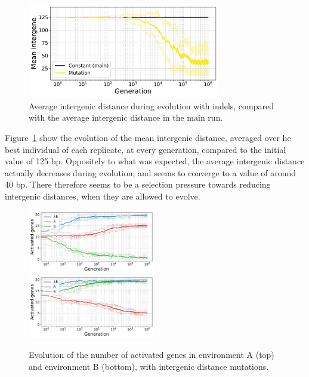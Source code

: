 \begin{figure}
\centering
  \includegraphics[width=0.75\textwidth]{param/evolve-intergene/intergenic_size_all.pdf}
\caption[Average intergenic size during evolution, with intergenic distance mutations]{Average intergenic distance during evolution with indels, compared with the average intergenic distance in the main run.}
\label{fig:param:evolve-intergene-intergene}
\end{figure}

Figure~\ref{fig:param:evolve-intergene-intergene} show the evolution of the mean intergenic distance, averaged over he best individual of each replicate, at every generation, compared to the initial value of 125 bp.
Oppositely to what was expected, the average intergenic distance actually decreases during evolution, and seems to converge to a value of around 40 bp.
There therefore seems to be a selection pressure towards reducing intergenic distances, when they are allowed to evolve.

\begin{figure}[H]
  \centering
  \includegraphics[width=0.495\textwidth]{param/evolve-intergene/gene_activity_env_A.pdf}
  \includegraphics[width=0.495\textwidth]{param/evolve-intergene/gene_activity_env_B.pdf}
  \caption[Evolution of the number of activated genes in each environment, with intergenic distance mutations]{Evolution of the number of activated genes in environment A (top) and environment B (bottom), with intergenic distance mutations.}
  \label{fig:param:evolve-intergene-activ-by-env}
\end{figure}

